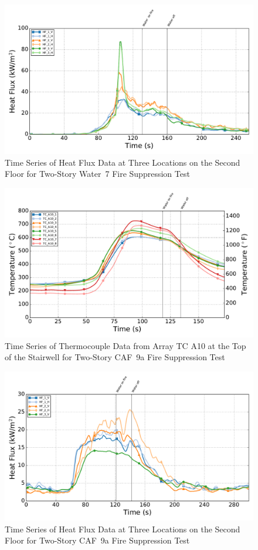 \documentclass[12pt,oneside]{book}
\begin{document}
\begin{figure}[!ht]
	\includegraphics[width=.85\columnwidth]{../Figures/Script_Figures/Test_39_West_061315_Heat_Flux}
	\caption{Time Series of Heat Flux Data at Three Locations on the Second Floor for Two-Story Water~7 Fire Suppression Test}
	\label{fig:water7_hf}
\end{figure}

\begin{figure}[!ht]
	\includegraphics[width=.85\columnwidth]{../Figures/Script_Figures/Test_41_West_061415_TC_A10}
	\caption{Time Series of Thermocouple Data from Array TC A10 at the Top of the Stairwell for Two-Story CAF~9a Fire Suppression Test}
	\label{fig:caf9a_tca10}
\end{figure}

\begin{figure}[!ht]
	\includegraphics[width=.85\columnwidth]{../Figures/Script_Figures/Test_41_West_061415_Heat_Flux}
	\caption{Time Series of Heat Flux Data at Three Locations on the Second Floor for Two-Story CAF~9a Fire Suppression Test}
	\label{fig:caf9a_hf}
\end{figure}
\end{document}
